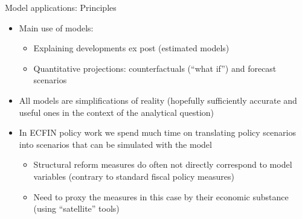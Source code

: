 \begin{frame}{Model applications: Principles}
\begin{itemize}
    \item Main use of models:
    \begin{itemize}
        \item Explaining developments ex post (estimated models)
        \item Quantitative projections: counterfactuals (``what if'') and forecast scenarios
    \end{itemize}
\item All models are simplifications of reality (hopefully sufficiently accurate and useful ones in the context of the analytical question)
\item In ECFIN policy work we spend much time on translating policy scenarios into scenarios that can be simulated with the model
\begin{itemize}
        \item Structural reform measures do often not directly correspond to model variables (contrary to standard fiscal policy measures) 
        \item Need to proxy the measures in this case by their economic substance (using ``satellite'' tools)    
    \end{itemize}
\end{itemize}
\end{frame}